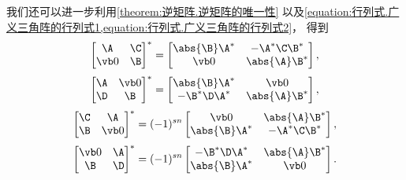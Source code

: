 \begin{remark}
我们还可以进一步利用\cref{theorem:逆矩阵.逆矩阵的唯一性}
以及\cref{equation:行列式.广义三角阵的行列式1,equation:行列式.广义三角阵的行列式2}，
得到\[
	\begin{bmatrix}
		\A & \C \\
		\vb0 & \B
	\end{bmatrix}^*
	= \begin{bmatrix}
		\abs{\B} \A^* & -\A^*\C\B^* \\
		\vb0 & \abs{\A} \B^*
	\end{bmatrix},
\]\[
	\begin{bmatrix}
		\A & \vb0 \\
		\D & \B
	\end{bmatrix}^*
	= \begin{bmatrix}
		\abs{\B} \A^* & \vb0 \\
		-\B^* \D \A^* & \abs{\A} \B^*
	\end{bmatrix},
\]\[
	\begin{bmatrix}
		\C & \A \\
		\B & \vb0
	\end{bmatrix}^*
	= (-1)^{sn} \begin{bmatrix}
		\vb0 & \abs{\A} \B^* \\
		\abs{\B} \A^* & -\A^*\C\B^*
	\end{bmatrix},
\]\[
	\begin{bmatrix}
		\vb0 & \A \\
		\B & \D
	\end{bmatrix}^*
	= (-1)^{sn} \begin{bmatrix}
		-\B^*\D\A^* & \abs{\A} \B^* \\
		\abs{\B} \A^* & \vb0
	\end{bmatrix}.
\]
\end{remark}

